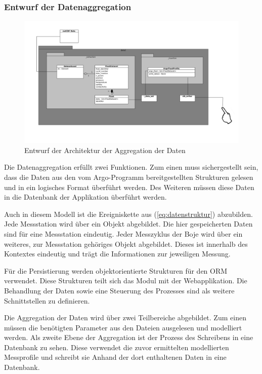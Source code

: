 \subsubsection{Entwurf der Datenaggregation}\label{sec:entwurfAggregation}
\begin{figure}[h!]
\centering
\includegraphics[width=\textwidth]{pix/grobentwurf_dataaggregation.png}
\caption{Entwurf der Architektur der Aggregation der Daten}
\label{fig:grobetwurf_architektur_datenaggregation}
\end{figure}

Die Datenaggregation erfüllt zwei Funktionen. Zum einen muss sichergestellt sein, dass die Daten aus den vom Argo-Programm bereitgestellten Strukturen gelesen und in ein logisches Format überführt werden. Des Weiteren müssen diese Daten in die Datenbank der Applikation überführt werden.

Auch in diesem Modell ist die Ereigniskette aus (\ref{eq:datenstruktur}) abzubilden. Jede Messstation wird über ein Objekt abgebildet. Die hier gespeicherten Daten sind für eine Messstation eindeutig. Jeder Messzyklus der Boje wird über ein weiteres, zur Messstation gehöriges Objekt abgebildet. Dieses ist innerhalb des Kontextes eindeutig und trägt die Informationen zur jeweiligen Messung.

Für die Persistierung  werden objektorientierte Strukturen für den \gls{ORM} verwendet. Diese Strukturen teilt sich das Modul mit der Webapplikation. Die Behandlung der Daten sowie eine Steuerung des Prozesses sind als weitere Schnittstellen zu definieren.

Die Aggregation der Daten wird über zwei Teilbereiche abgebildet. Zum einen müssen die benötigten Parameter aus den Dateien ausgelesen und modelliert werden.
Als zweite Ebene der Aggregation ist der Prozess des Schreibens in eine Datenbank zu sehen. Diese verwendet die zuvor ermittelten modellierten Messprofile und schreibt sie Anhand der dort enthaltenen Daten in eine Datenbank.


